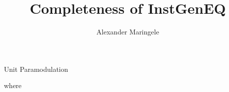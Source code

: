 \documentclass[%
handout,
]{beamer}
\title[Completeness]{Completeness of InstGenEQ}
\author[{A$\ell$M}]{%
	Alexander Maringele
}
\institute[UIBK]{%
	{alexander.maringele@gmail.com}
}
\begin{document}
\titleframe

\begin{frame}
    \nocite{GK2004csl}
    
    
\end{frame}

\begin{frame}{Unit Paramodulation}
    \begin{definition}
    
    where
    
    \end{definition}
\end{frame}
\end{document}
